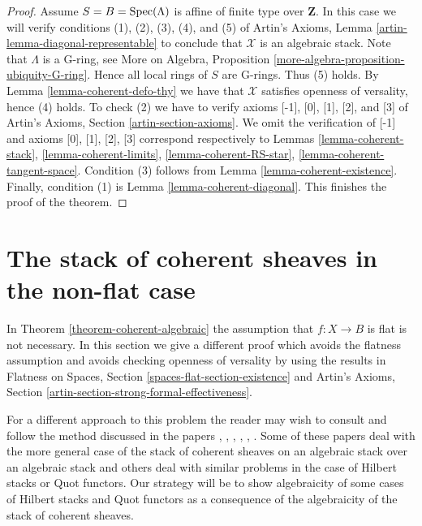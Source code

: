 \begin{proof}
\medskip\noindent
Assume $S = B = \mathop{\mathrm{Spec}}(\Lambda)$ is affine of finite type over $\mathbf{Z}$.
In this case we will verify conditions (1), (2), (3), (4), and (5) of
Artin's Axioms, Lemma \ref{artin-lemma-diagonal-representable}
to conclude that $\mathcal{X}$ is an algebraic stack.
Note that $\Lambda$ is a G-ring, see
More on Algebra, Proposition \ref{more-algebra-proposition-ubiquity-G-ring}.
Hence all local rings of $S$ are G-rings. Thus (5) holds.
By Lemma \ref{lemma-coherent-defo-thy}
we have that $\mathcal{X}$ satisfies openness of versality, hence (4) holds.
To check (2) we have to verify axioms [-1], [0], [1], [2], and [3]
of Artin's Axioms, Section \ref{artin-section-axioms}.
We omit the verification of [-1] and axioms
[0], [1], [2], [3] correspond respectively to
Lemmas \ref{lemma-coherent-stack},
\ref{lemma-coherent-limits},
\ref{lemma-coherent-RS-star},
\ref{lemma-coherent-tangent-space}.
Condition (3) follows from Lemma \ref{lemma-coherent-existence}.
Finally, condition (1) is Lemma \ref{lemma-coherent-diagonal}.
This finishes the proof of the theorem.
\end{proof}








\section{The stack of coherent sheaves in the non-flat case}
\label{section-not-flat}

\noindent
In Theorem \ref{theorem-coherent-algebraic} the assumption that $f : X \to B$
is flat is not necessary. In this section we give a different proof
which avoids the flatness assumption and avoids checking openness
of versality by using the results
in Flatness on Spaces, Section \ref{spaces-flat-section-existence} and
Artin's Axioms, Section \ref{artin-section-strong-formal-effectiveness}.

\medskip\noindent
For a different approach to this problem the reader may wish to consult
\cite{ArtinI} and follow the method discussed in the papers
\cite{olsson-starr}, \cite{lieblich_remarks}, \cite{olsson_proper},
\cite{Hall-Rydh}, \cite{Hall-Rydh-Hilbert}, \cite{rydh_representability}.
Some of these papers deal with the more general case of the stack of
coherent sheaves on an algebraic stack over an algebraic stack and
others deal with similar problems in the case of Hilbert stacks
or Quot functors. Our strategy will be to show algebraicity of some
cases of Hilbert stacks and Quot functors as a consequence of the
algebraicity of the stack of coherent sheaves.

